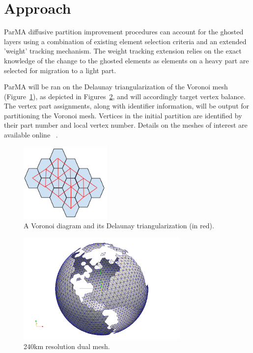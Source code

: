 \documentclass[a4paper]{article}
\begin{document}
\section{Approach}

ParMA diffusive partition improvement procedures can account for the ghosted layers using a combination of existing element selection criteria and an extended 'weight' tracking mechanism.  The weight tracking extension relies on the exact knowledge of the change to the ghosted elements as elements on a heavy part are selected for migration to a light part.

ParMA will be ran on the Delaunay triangularization of the Voronoi mesh (Figure~\ref{fig:delaunay}), as depicted in Figures~\ref{fig:NA240}, and will accordingly target vertex balance.  The vertex part assignments, along with identifier information, will be output for partitioning the Voronoi mesh. Vertices in the initial partition are identified by their part number and local vertex number.  Details on the meshes of interest are available online ~\cite{climateMesh}. 

\begin{figure} 
\centering
\includegraphics[width=0.4\textwidth]{ghostingOwnershipFig1.png}
\caption{\label{fig:delaunay} A Voronoi diagram and its Delaunay triangularization (in red).}
\end{figure}

\begin{figure}
\centering
\includegraphics[width=0.75\textwidth]{ocean_QU_240kmNA.png}
\caption{\label{fig:NA240} 240km resolution dual mesh.}
\end{figure}
\end{document}
